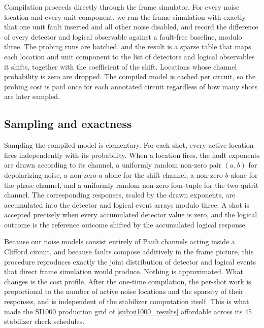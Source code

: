 Compilation proceeds directly through the frame simulator. For every noise location and every unit component, we run the frame simulation with exactly that one unit fault inserted and all other noise disabled, and record the difference of every detector and logical observable against a fault-free baseline, modulo three. The probing runs are batched, and the result is a sparse table that maps each location and unit component to the list of detectors and logical observables it shifts, together with the coefficient of the shift. Locations whose channel probability is zero are dropped. The compiled model is cached per circuit, so the probing cost is paid once for each annotated circuit regardless of how many shots are later sampled.

\subsection{Sampling and exactness}

Sampling the compiled model is elementary. For each shot, every active location fires independently with its probability. When a location fires, the fault exponents are drawn according to its channel, a uniformly random non-zero pair $(a,b)$ for depolarizing noise, a non-zero $a$ alone for the shift channel, a non-zero $b$ alone for the phase channel, and a uniformly random non-zero four-tuple for the two-qutrit channel. The corresponding responses, scaled by the drawn exponents, are accumulated into the detector and logical event arrays modulo three. A shot is accepted precisely when every accumulated detector value is zero, and the logical outcome is the reference outcome shifted by the accumulated logical response.

Because our noise models consist entirely of Pauli channels acting inside a Clifford circuit, and because faults compose additively in the frame picture, this procedure reproduces exactly the joint distribution of detector and logical events that direct frame simulation would produce. Nothing is approximated. What changes is the cost profile. After the one-time compilation, the per-shot work is proportional to the number of active noise locations and the sparsity of their responses, and is independent of the stabilizer computation itself. This is what made the SI1000 production grid of \autoref{sub:si1000_results} affordable across its 45 stabilizer check schedules.
